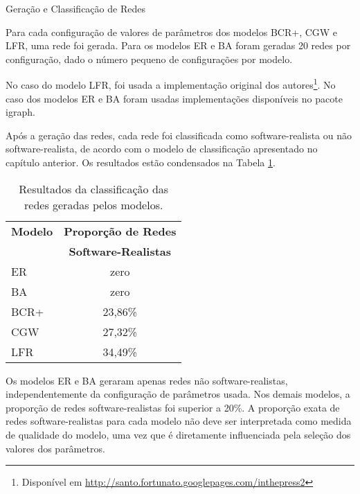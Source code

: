 \begin{section}{Geração e Classificação de Redes}
	
	Para cada configuração de valores de parâmetros dos modelos BCR+, CGW e LFR, uma rede foi gerada. Para os modelos ER e BA foram geradas 20 redes por configuração, dado o número pequeno de configurações por modelo. 
	
	No caso do modelo LFR, foi usada a implementação original dos autores\footnote{Disponível em \url{http://santo.fortunato.googlepages.com/inthepress2}}. No caso dos modelos ER e BA foram usadas implementações disponíveis no pacote igraph\cite{igraph}.
	
	Após a geração das redes, cada rede foi classificada como software-realista ou não software-realista, de acordo com o modelo de classificação apresentado no capítulo anterior. Os resultados estão condensados na Tabela \ref{tab:results}.

	

\begin{table}
\caption{Resultados da classificação das redes geradas pelos modelos.}
\centering
\begin{tabular}{|l|c|}
\hline
\textbf{Modelo} & \textbf{Proporção de Redes} \\ & \textbf{Software-Realistas} \\
\hline 
\hline
ER & zero \\ %
\hline
BA & zero \\ %
\hline
BCR+ & 23,86\% \\ %
\hline
CGW  & 27,32\% \\  %
\hline
LFR  & 34,49\% \\ %
\hline
\end{tabular}
\label{tab:results}
\end{table}

	Os modelos ER e BA geraram apenas redes não software-realistas, independentemente da configuração de parâmetros usada. Nos demais modelos, a proporção de redes software-realistas foi superior a 20\%. A proporção exata de redes software-realistas para cada modelo não deve ser interpretada como medida de qualidade do modelo, uma vez que é diretamente influenciada pela seleção dos valores dos parâmetros.

\end{section}

